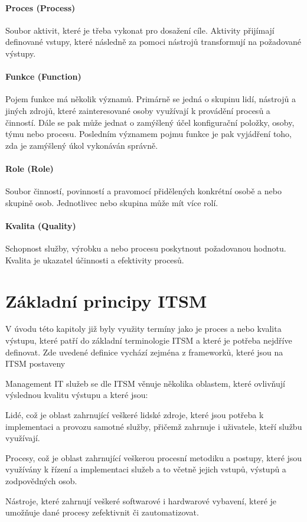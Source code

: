 \documentclass[
  digital,     %
  twoside,     %
  lof,         %
  lot,         %
]{fithesis4}
\begin{document}
\paragraph{Proces (Process)}
Soubor aktivit, které je třeba vykonat pro dosažení cíle. Aktivity přijímají definované vstupy, které následně za pomoci nástrojů transformují na požadované výstupy.
\paragraph{Funkce (Function)}
Pojem funkce má několik významů. Primárně se jedná o skupinu lidí, nástrojů a jiných zdrojů, které zainteresované osoby využívají k provádění procesů a činností. Dále se pak může jednat o zamýšlený účel konfigurační položky, osoby, týmu nebo procesu. Posledním významem pojmu funkce je pak vyjádření toho, zda je zamýšlený úkol vykonáván správně. 
\paragraph{Role (Role)}
Soubor činností, povinností a pravomocí přidělených konkrétní osobě a nebo skupině osob. Jednotlivec nebo skupina může mít více rolí.
\paragraph{Kvalita (Quality)}
Schopnost služby, výrobku a nebo procesu poskytnout požadovanou hodnotu. Kvalita je ukazatel účinnosti a efektivity procesů.
\section{Základní principy ITSM}
V úvodu této kapitoly již byly využity termíny jako je proces a nebo kvalita výstupu, které patří do základní terminologie ITSM a které je potřeba nejdříve definovat. Zde uvedené definice vychází zejména z frameworků, které jsou na ITSM postaveny

Management IT služeb se dle ITSM věnuje několika oblastem, které ovlivňují výslednou kvalitu výstupu a které jsou:
\begin{compactitem}
  \item Lidé, což je oblast zahrnující veškeré lidské zdroje, které jsou potřeba k implementaci a provozu samotné služby, přičemž zahrnuje i uživatele, kteří službu využívají.
  \item Procesy, což je oblast zahrnující veškerou procesní metodiku a postupy, které jsou využívány k řízení a implementaci služeb a to včetně jejich vstupů, výstupů a zodpovědných osob.
  \item Nástroje, které zahrnují veškeré softwarové i hardwarové vybavení, které je umožňuje dané procesy zefektivnit či zautomatizovat.
\end{compactitem}
\end{document}
